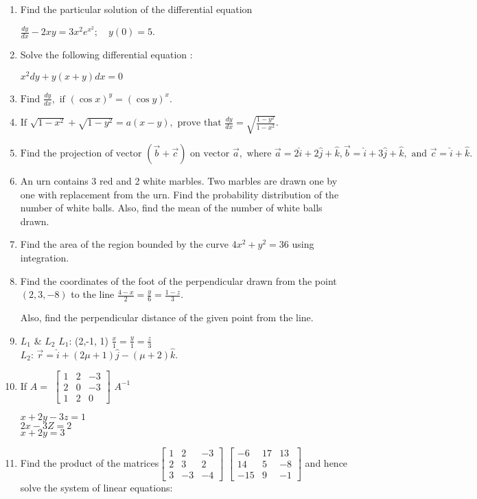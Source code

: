 \documentclass{article}
\providecommand{\myvec}[1]
{\ensuremath{\begin{bmatrix}#1\end{bmatrix}}}
\begin{document}
\begin{enumerate}
\item Find the particular solution of the differential equation

$\frac{dy}{dx} - 2xy = 3x^2e^{x^2}; \quad y(0) = 5.$

\item Solve the following differential equation :

$x^2 dy + y(x+y) dx = 0$

\item $\text{Find } \frac{dy}{dx} , \text{ if } (\cos{x})^y = (\cos{y})^x.$

\item $\text{If } \sqrt{1-x^2} + \sqrt{1-y^2} = a(x-y), \text{ prove that } \frac{dy}{dx} = \sqrt{\frac{1-y^2}{1-x^2}} .$

\item $\text{Find the projection of vector }(\vec{b} + \vec{c}) \text{ on vector } \vec{a}, \text{ where } \vec{a} = 2\hat{i} + 2\hat{j} + \hat{k}, \vec{b} = \hat{i} + 3\hat{j} + \hat{k}, \text{ and } \vec{c} = \hat{i} + \hat{k}.$

\item An urn contains 3 red and 2 white marbles. Two marbles are drawn one by one with replacement from the urn. Find the probability distribution of the number of white balls. Also, find the mean of the number of white balls drawn.

\item Find the area of the region bounded by the curve $4x^2 + y^2 = 36$ using integration.

\item  Find the coordinates of the foot of the perpendicular drawn from the point $(2, 3, -8)$ to the line $\frac{4-x}{2} = \frac{y}{6} = \frac{1-z}{3}$.

Also, find the perpendicular distance of the given point from the line.
\item {} $L_1$  \& $ L_2$ 
$L_1$: (2,-1, 1) $ \frac{x}{1} = \frac{y}{1} = \frac{z}{3}$\\
$L_2$: $\vec{r} = \hat{i} + (2\mu+1)\hat{j} - (\mu+2)\hat{k}.$
\item If $ A = $ $\myvec{
1 & 2 & -3 \\
2 & 0 & -3 \\
1 & 2 & 0} $ $A^{-1}$

$x +2y-3z=1$\\
$2x-3Z=2$\\
$x+2y=3$
\item Find the product of the matrices$\myvec{
    1 & 2 & -3\\
    2 & 3 & 2\\
    3 & -3 & -4}$
$\myvec{
    -6 & 17 & 13\\
    14 & 5 & -8\\
    -15 & 9 & -1
}$ and hence solve the system of linear equations:


\end{enumerate}
\end{document}
